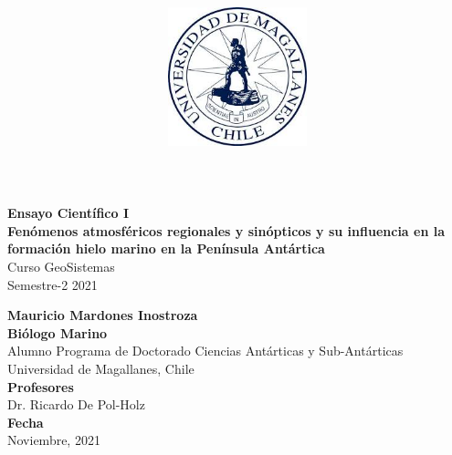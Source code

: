 \documentclass[
]{article}
\title{\includegraphics[width=4cm,height=\textheight]{logoUMAG.jpg}}
\author{}
\date{\vspace{-2.5em}}
\begin{document}
\maketitle



\begin{flushleft}
\Large{\textbf{Ensayo Científico I}}\\
\vspace*{2\baselineskip}
\LARGE{\textbf{Fenómenos atmosféricos regionales y sinópticos y su influencia en la formación hielo marino en la Península Antártica}}\\
\vspace*{3\baselineskip}
\Large{Curso GeoSistemas}\\
\vspace*{1\baselineskip}
\Large{Semestre-2 2021 }\\
\vspace*{3\baselineskip}
\end{flushleft}
\begin{flushright}
\large{\textbf{Mauricio Mardones Inostroza}}\\
\large{\textbf{Biólogo Marino}}\\
\vspace*{2\baselineskip}
\normalsize{Alumno Programa de Doctorado Ciencias Antárticas y Sub-Antárticas}\\
\vspace*{1\baselineskip}
\normalsize{Universidad de Magallanes, Chile}\\
\vspace*{1\baselineskip}
\normalsize{\textbf{Profesores}}\\
Dr. Ricardo De Pol-Holz\\
\vspace*{1\baselineskip}
\normalsize{\textbf{Fecha}}\\
Noviembre, 2021
\end{flushright}



\hypersetup{linkcolor = black}
\newpage
{}

\newpage



\hypersetup{linkcolor = blue}

\fontsize{12}{26}
\selectfont{}
\end{document}
